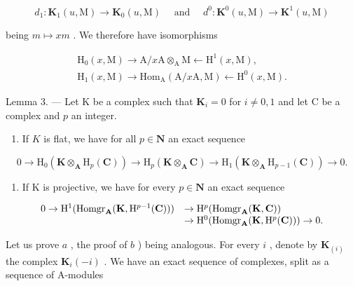 \[
d _ {1}: \mathbf {K} _ {1} (u, \mathrm{M}) \rightarrow \mathbf {K} _ {0} (u, \mathrm{M}) \quad \text { and }\quad d ^ {0}: \mathbf {K} ^ {0} (u, \mathrm{M}) \rightarrow \mathbf {K} ^ {1} (u, \mathrm{M})
\]

being \(m \mapsto xm\) . We therefore have isomorphisms

\[
\begin{array}{l} \mathrm{H} _ {0} (x, \mathrm{M}) \to \mathrm{A} / x \mathrm{A} \otimes_ {\mathrm{A}} \mathrm{M} \leftarrow \mathrm{H} ^ {1} (x, \mathrm{M}), \\ \mathrm{H} _ {1} (x, \mathrm{M}) \to \mathrm{Hom} _ {\mathrm{A}} (\mathrm{A} / x \mathrm{A}, \mathrm{M}) \leftarrow \mathrm{H} ^ {0} (x, \mathrm{M}). \end{array}
\]

Lemma 3. --- Let K be a complex such that \(\mathbf{K}_i = 0\) for \(i \neq 0, 1\) and let C be a complex and \(p\) an integer.

\begin{enumerate}
\def\labelenumi{\alph{enumi})}
\tightlist
\item
  If \(K\) is flat, we have for all \(p \in \mathbf{N}\) an exact sequence
\end{enumerate}

\[
0 \rightarrow \mathrm{H} _ {0} (\mathbf {K} \otimes_ {\mathbf {A}} \mathrm{H} _ {p} (\mathbf {C})) \rightarrow \mathrm{H} _ {p} (\mathbf {K} \otimes_ {\mathbf {A}} \mathbf {C}) \rightarrow \mathrm{H} _ {1} (\mathbf {K} \otimes_ {\mathbf {A}} \mathrm{H} _ {p - 1} (\mathbf {C})) \rightarrow 0.
\]

\begin{enumerate}
\def\labelenumi{\alph{enumi})}
\setcounter{enumi}{1}
\tightlist
\item
  If K is projective, we have for every \(p \in \mathbf{N}\) an exact sequence
\end{enumerate}

\[
\begin{array}{r l} 0 \to \mathrm{H} ^ {1} (\operatorname{Homgr} _ {\mathbf {A}} (\mathbf {K}, \mathrm{H} ^ {p - 1} (\mathbf {C}))) & \to \mathrm{H} ^ {p} (\operatorname{Homgr} _ {\mathbf {A}} (\mathbf {K}, \mathbf {C})) \\ & \to \mathrm{H} ^ {0} (\operatorname{Homgr} _ {\mathbf {A}} (\mathbf {K}, \mathrm{H} ^ {p} (\mathbf {C}))) \to 0. \end{array}
\]

Let us prove \(a\) , the proof of \(b\) ) being analogous. For every \(i\) , denote by \(\mathbf{K}_{(i)}\) the complex \(\mathbf{K}_i(-i)\) . We have an exact sequence of complexes, split as a sequence of A-modules

